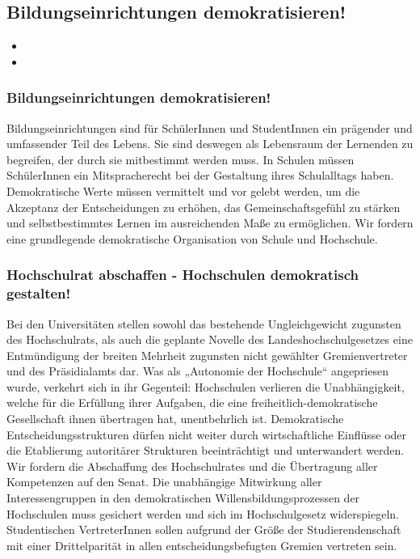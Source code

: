 \subsection*{Bildungseinrichtungen demokratisieren!}
\label{wp:bildung:demokratie1}
\begin{itemize}
\item {}
\item {}
\end{itemize}

\subsubsection{Bildungseinrichtungen demokratisieren!}
\abstimmung
Bildungseinrichtungen sind für SchülerInnen und StudentInnen ein prägender und umfassender Teil des Lebens. Sie sind deswegen als Lebensraum der Lernenden zu begreifen, der durch sie mitbestimmt werden muss. In Schulen müssen SchülerInnen ein Mitspracherecht bei der Gestaltung ihres Schulalltags haben. Demokratische Werte müssen vermittelt und vor gelebt werden, um die Akzeptanz der Entscheidungen zu erhöhen, das Gemeinschaftsgefühl zu stärken und selbstbestimmtes Lernen im ausreichenden Maße zu ermöglichen. Wir fordern eine grundlegende demokratische Organisation von Schule und Hochschule.

\subsubsection{Hochschulrat abschaffen - Hochschulen demokratisch gestalten!}
\abstimmung
Bei den Universitäten stellen sowohl das bestehende Ungleichgewicht zugunsten des Hochschulrats, als auch die geplante Novelle des Landeshochschulgesetzes eine Entmündigung der breiten Mehrheit zugunsten nicht gewählter Gremienvertreter und des Präsidialamts dar. Was als „Autonomie der Hochschule“ angepriesen wurde, verkehrt sich in ihr Gegenteil: Hochschulen verlieren die Unabhängigkeit, welche für die Erfüllung ihrer Aufgaben, die eine freiheitlich-demokratische Gesellschaft ihnen übertragen hat, unentbehrlich ist. Demokratische Entscheidungsstrukturen dürfen nicht weiter durch wirtschaftliche Einflüsse oder die Etablierung autoritärer Strukturen beeinträchtigt und unterwandert werden. Wir fordern die Abschaffung des Hochschulrates und die Übertragung aller Kompetenzen auf den Senat. Die unabhängige Mitwirkung aller Interessengruppen in den demokratischen Willensbildungsprozessen der Hochschulen muss gesichert werden und sich im Hochschulgesetz widerspiegeln. Studentischen VertreterInnen sollen aufgrund der Größe der Studierendenschaft mit einer Drittelparität in allen entscheidungsbefugten Gremien vertreten sein.

